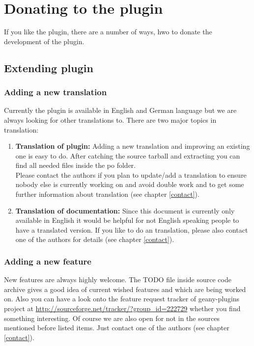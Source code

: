 \documentclass[%
a4paper,%
10pt,%
oneside,%
DIV18,
headsepline,
plainheadsepline,
footsepline,
plainfootsepline,
bibtotoc,%
liststotoc,%
BCOR12mm,%
halfparskip,%
openany,%
]{scrartcl}
\begin{document}
\section{Donating to the plugin}
If you like the plugin, there are a number of ways, hwo to donate the
development of the plugin.

\subsection{Extending plugin}

\subsubsection{Adding a new translation}
\label{sec:translating}
Currently the plugin is available in English and German language but
we are always looking for other translations to. There are two major
topics in translation:

\begin{enumerate}
\item \textbf{Translation of plugin:}
	   Adding a new translation and improving an existing one is easy to
	   do. After catching the source tarball and extracting you can find
	   all needed files inside the po folder. \\
	   Please contact the authors if you plan to update/add a translation
	   to ensure nobody else is currently working on and avoid double
	   work and to get some further information about translation (see
	   chapter \ref{contact}).
\item \textbf{Translation of documentation:}
	   Since this document is currently only available in English it
	   would be helpful for not English speaking people to have a
	   translated version. If you like to do an translation, please
	   also contact one of the authors for details (see chapter \ref{contact}).
\end{enumerate}

\subsubsection{Adding a new feature}
New features are always highly welcome. The TODO file inside source
code archive gives a good idea of current wished features and which
are being worked on. Also you can have a look onto the feature request
tracker of geany-plugins project at
\url{http://sourceforge.net/tracker/?group\_id=222729} whether you find
something interesting. Of course we are also open for not in the
sources mentioned before listed items. Just contact one of the authors
(see chapter \ref{contact}).
\end{document}
